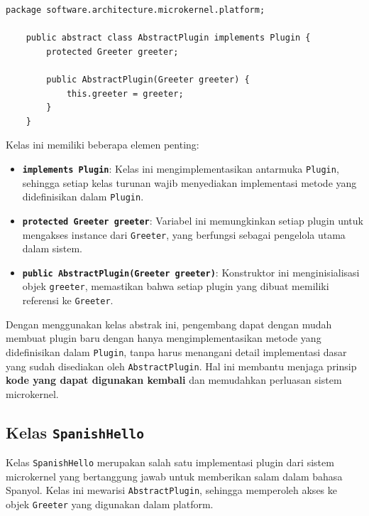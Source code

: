 \begin{lstlisting}[style=JavaStyle, caption={Kelas Abstrak \texttt{AbstractPlugin}}, label={lst:abstract-plugin}]
	package software.architecture.microkernel.platform;
	
	public abstract class AbstractPlugin implements Plugin {
		protected Greeter greeter;
		
		public AbstractPlugin(Greeter greeter) {
			this.greeter = greeter;
		}
	}
\end{lstlisting}

\noindent
Kelas ini memiliki beberapa elemen penting:

\begin{itemize}
	\item \textbf{\texttt{implements Plugin}}: Kelas ini mengimplementasikan antarmuka \texttt{Plugin}, sehingga setiap kelas turunan wajib menyediakan implementasi metode yang didefinisikan dalam \texttt{Plugin}.
	\item \textbf{\texttt{protected Greeter greeter}}: Variabel ini memungkinkan setiap plugin untuk mengakses instance dari \texttt{Greeter}, yang berfungsi sebagai pengelola utama dalam sistem.
	\item \textbf{\texttt{public AbstractPlugin(Greeter greeter)}}: Konstruktor ini menginisialisasi objek \texttt{greeter}, memastikan bahwa setiap plugin yang dibuat memiliki referensi ke \texttt{Greeter}.
\end{itemize}

Dengan menggunakan kelas abstrak ini, pengembang dapat dengan mudah membuat plugin baru dengan hanya mengimplementasikan metode yang didefinisikan dalam \texttt{Plugin}, tanpa harus menangani detail implementasi dasar yang sudah disediakan oleh \texttt{AbstractPlugin}. Hal ini membantu menjaga prinsip \textbf{kode yang dapat digunakan kembali} dan memudahkan perluasan sistem microkernel.


\subsection{Kelas \texttt{SpanishHello}}

Kelas \texttt{SpanishHello} merupakan salah satu implementasi plugin dari sistem microkernel yang bertanggung jawab untuk memberikan salam dalam bahasa Spanyol. Kelas ini mewarisi \texttt{AbstractPlugin}, sehingga memperoleh akses ke objek \texttt{Greeter} yang digunakan dalam platform.

